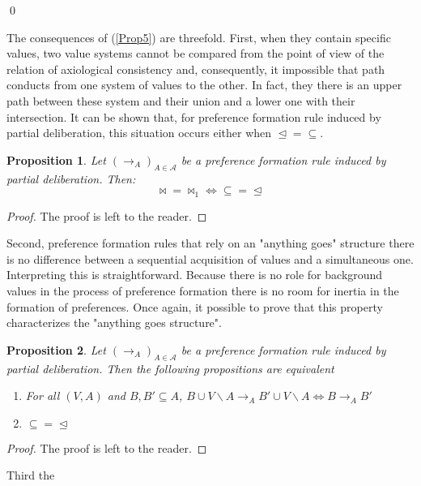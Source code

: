 \documentclass[11pt]{article}
\newtheorem{proposition}{Proposition}
\begin{document}
\qed

The consequences of (\ref{Prop5}) are threefold. First, when they contain specific values, two value systems cannot be compared from the point of view of the relation of axiological consistency and, consequently, it impossible that path conducts from one system of values to the other. In fact, they there is an upper path between these system and their union and a lower one with their intersection. It can be shown that, for preference formation rule induced by partial deliberation, this situation occurs either when $\trianglelefteq = \subseteq$.

\begin{proposition} Let $(\rightarrow_A)_{A\in\mathcal{A}}$ be a preference formation rule induced by partial deliberation. Then:
\begin{equation*}
\bowtie=\bowtie_1 \iff \subseteq = \trianglelefteq
\end{equation*}
\end{proposition}

\begin{proof}
The proof is left to the reader. 
\end{proof}



Second, preference formation rules that rely on an "anything goes" structure there is no difference between a sequential acquisition of values and a simultaneous one. Interpreting this is straightforward. Because there is no role for background values in the process of preference formation there is no room for inertia in the formation of preferences. Once again, it possible to prove that this property characterizes the "anything goes structure".  

\begin{proposition} Let $(\rightarrow_A)_{A\in\mathcal{A}}$ be a preference formation rule induced by partial deliberation. Then the following propositions are equivalent 

\begin{enumerate}
\item For all $(V, A)$ and $B,B'\subseteq A$, $B\cup V\backslash A \rightarrow_A B'\cup V\backslash A \iff B\rightarrow_A B'$
\item $\subseteq = \trianglelefteq $
\end{enumerate}
\end{proposition}

\begin{proof}
The proof is left to the reader. 
\end{proof}
Third the 
\end{document}
